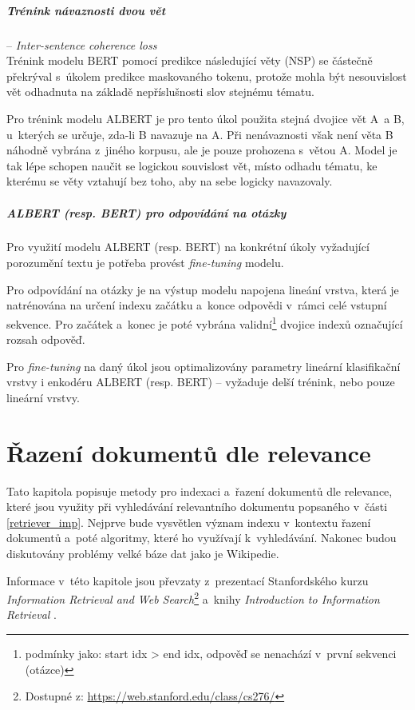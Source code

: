 \paragraph{Trénink návaznosti dvou vět} -- \textit{Inter-sentence coherence loss}\\
Trénink modelu BERT pomocí predikce následující věty (NSP) se částečně překrýval s~úkolem predikce maskovaného tokenu, protože mohla být nesouvislost vět odhadnuta na základě nepříslušnosti slov stejnému tématu.\par
Pro trénink modelu ALBERT je pro tento úkol použita stejná dvojice vět A~a B, u~kterých se určuje, zda-li B navazuje na A. Při nenávaznosti však není věta B náhodně vybrána z~jiného korpusu, ale je pouze prohozena s~větou A. Model je tak lépe schopen naučit se logickou souvislost vět, místo odhadu tématu, ke kterému se věty vztahují bez toho, aby na sebe logicky navazovaly.
\bigskip\bigskip
\paragraph{ALBERT (resp. BERT) pro odpovídání na otázky}
Pro využití modelu ALBERT (resp. BERT) na konkrétní úkoly vyžadující porozumění textu je potřeba provést \emph{fine-tuning} modelu.\par
Pro odpovídání na otázky je na výstup modelu napojena lineání vrstva, která je natrénována na určení indexu začátku a~konce odpovědi v~rámci celé vstupní sekvence. Pro začátek a~konec je poté vybrána validní\footnote{podmínky jako: start idx > end idx, odpověď se nenachází v~první sekvenci (otázce)} dvojice indexů označující rozsah odpověď.\par
Pro \emph{fine-tuning} na daný úkol jsou optimalizovány parametry lineární klasifikační vrstvy i enkodéru ALBERT (resp. BERT) -- vyžaduje delší trénink, nebo pouze lineární vrstvy.


\chapter{Řazení dokumentů dle relevance}
\label{document_indexing}
Tato kapitola popisuje metody pro indexaci a~řazení dokumentů dle relevance, které jsou využity při vyhledávání relevantního dokumentu popsaného v~části \ref{retriever_imp}. Nejprve bude vysvětlen význam indexu v~kontextu řazení dokumentů a~poté algoritmy, které ho využívají k~vyhledávání. Nakonec budou diskutovány problémy velké báze dat jako je Wikipedie.\par
Informace v~této kapitole jsou převzaty z~prezentací Stanfordského kurzu \emph{Information Retrieval and Web Search}\footnote{Dostupné z: \url{https://web.stanford.edu/class/cs276/}} a~knihy \emph{Introduction to Information Retrieval} \cite{information_retrieval}.

